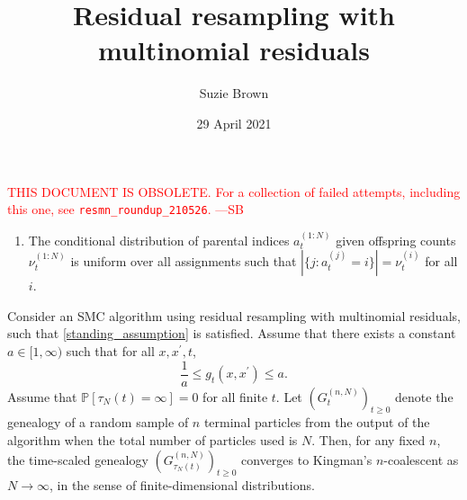 \documentclass{article}
\title{Residual resampling with multinomial residuals}
\author{Suzie Brown}
\date{29 April 2021}
\newcommand{\seb}[1]{\xspace\textcolor{red}{#1 ---SB}\xspace} %
\theoremstyle{definition}
\newcommand{\Prob}{\mathbb{P}}
\newcommand{\1}[1]{\mathbbm{1}_{#1}} %
\begin{document}
\maketitle
\thispagestyle{fancy}

\seb{THIS DOCUMENT IS OBSOLETE. For a collection of failed attempts, including this one, see \texttt{resmn\_roundup\_210526}. }

\begin{enumerate}[label=(A\arabic*)]
\item\label{standing_assumption} The conditional distribution of parental indices $a_t^{(1:N)}$ given offspring counts $\nu_t^{(1:N)}$ is uniform over all assignments such that $ |\{ j: a_t^{(j)} =i \}|= \nu_t^{(i)} $ for all $i$.
\end{enumerate}

\begin{corollary}\label{thm:residual_multinomial}
Consider an SMC algorithm using residual resampling with multinomial residuals, such that \ref{standing_assumption} is satisfied.
Assume that there exists a constant $a\in [1,\infty)$ such that for all $x, x^\prime, t$,
\begin{equation*}
\frac{1}{a} \leq g_t(x, x^\prime) \leq a .
\end{equation*}
Assume that $\Prob[ \tau_N(t) = \infty] =0$ for all finite $t$.
Let $(G_t^{(n,N)})_{t\geq0}$ denote the genealogy of a random sample of $n$ terminal particles from the output of the algorithm when the total number of particles used is $N$. Then, for any fixed $n$, the time-scaled genealogy $(G_{\tau_N(t)}^{(n,N)})_{t\geq0}$ converges to Kingman's $n$-coalescent as $N\to \infty$, in the sense of finite-dimensional distributions.
\end{corollary}
\end{document}
